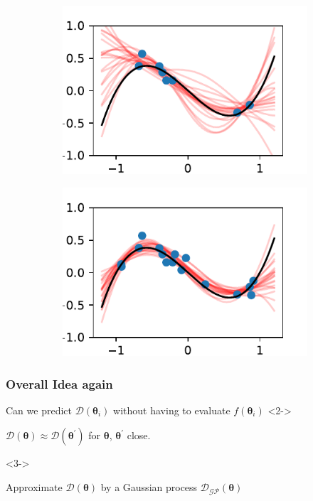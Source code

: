 \documentclass{beamer}
\begin{document}
\begin{frame}
\begin{figure}
\begin{subfigure}[t]{0.4\textwidth}
            \includegraphics[width=\textwidth]{cub_GP_err_8_iters.pdf}
        \end{subfigure}%
        \begin{subfigure}[t]{0.4\textwidth}
            \centering
            \includegraphics[width=\textwidth]{cub_GP_err_16_iters.pdf}
        \end{subfigure}%
    \end{figure}
\end{frame}

\begin{frame}
    \frametitle{Overall Idea again}
    \begin{itemize}
        \item Can we predict $\mathcal{D}(\bm{\theta}_i)$ without having to evaluate $f(\bm{\theta}_i)$
              <2->{\item $\mathcal{D}(\bm{\theta}) \approx \mathcal{D}(\bm{\theta}^\prime)$
              for $\bm{\theta}$, $\bm{\theta}^\prime$ close.}
              <3->{\item Approximate $\mathcal{D}(\bm{\theta})$ by a Gaussian
              process $\mathcal{D}_\mathcal{GP}(\bm{\theta})$}
    \end{itemize}
\end{frame}
\end{document}

